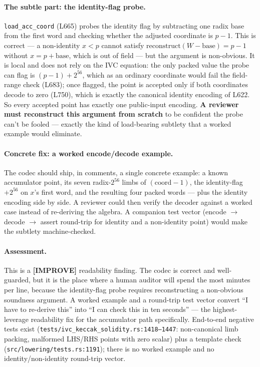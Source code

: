 \paragraph{The subtle part: the identity-flag probe.}
\texttt{load\_acc\_coord} (L665) probes the identity flag by
subtracting one radix base from the first word and checking
whether the adjusted coordinate is $p-1$. This is correct ---
a non-identity $x < p$ cannot satisfy
$\text{reconstruct}(W - \text{base}) = p-1$ without
$x = p + \text{base}$, which is out of field --- but the
argument is non-obvious.  It is local and does
not rely on the IVC equation: the only packed value the probe can
flag is $(p-1)+2^{56}$, which as an ordinary coordinate would fail
the field-range check (L683); once flagged, the point is accepted
only if both coordinates decode to zero (L750), which is exactly
the canonical identity encoding of L622. So every accepted point
has exactly one public-input encoding.
\textbf{A reviewer must reconstruct
this argument from scratch} to be confident the probe can't be
fooled --- exactly the kind of load-bearing subtlety that a
worked example would eliminate.

\paragraph{Concrete fix: a worked encode/decode example.}
The codec should ship, in comments, a single concrete example:
a known accumulator point, its seven radix-$2^{56}$ limbs of
$(\text{coord}-1)$, the identity-flag $+2^{56}$ on $x$'s first
word, and the resulting four packed words --- plus the identity
encoding side by side. A reviewer could then verify the decoder
against a worked case instead of re-deriving the algebra. A
companion test vector (encode $\to$ decode $\to$ assert round-trip
for identity and a non-identity point) would make the subtlety
machine-checked.

\paragraph{Assessment.} This is a
\textcolor{codegenblue}{\textbf{[IMPROVE]}} readability finding.
The codec is correct and well-guarded, but it is the place where
a human auditor will spend the most minutes per line, because
the identity-flag probe requires reconstructing a non-obvious
soundness argument. A worked example and a round-trip test vector
convert ``I have to re-derive this'' into ``I can check this in
ten seconds'' --- the highest-leverage readability fix for the
accumulator path specifically.  End-to-end
negative tests exist (\texttt{tests/\allowbreak{}ivc\_\allowbreak{}keccak\_\allowbreak{}solidity.rs:1418--1447}:
non-canonical limb packing, malformed LHS/RHS points with zero
scalar) plus a template check
(\texttt{src/\allowbreak{}lowering/\allowbreak{}tests.rs:1191}); there is no worked example
and no identity/non-identity round-trip vector.

